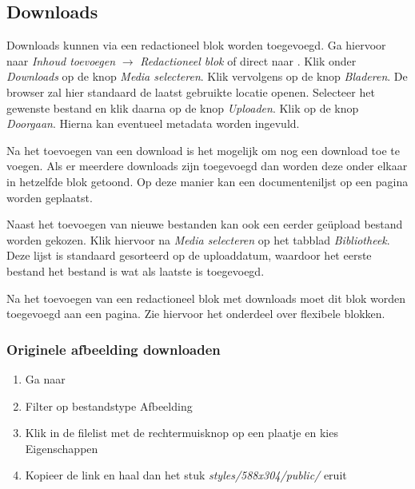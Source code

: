 
\subsection{Downloads}
Downloads kunnen via een redactioneel blok worden toegevoegd. Ga hiervoor naar \emph{Inhoud toevoegen} $\rightarrow$ \emph{Redactioneel blok} of direct naar . Klik onder \emph{Downloads} op de knop \emph{Media selecteren}. Klik vervolgens op de knop \emph{Bladeren}. De browser zal hier standaard de laatst gebruikte locatie openen. Selecteer het gewenste bestand en klik daarna op de knop \emph{Uploaden}. Klik op de knop \emph{Doorgaan}. Hierna kan eventueel metadata worden ingevuld.

Na het toevoegen van een download is het mogelijk om nog een download toe te voegen. Als er meerdere downloads zijn toegevoegd dan worden deze onder elkaar in hetzelfde blok getoond. Op deze manier kan een documenteniljst op een pagina worden geplaatst.

Naast het toevoegen van nieuwe bestanden kan ook een eerder ge\"{u}pload bestand worden gekozen. Klik hiervoor na \emph{Media selecteren} op het tabblad \emph{Bibliotheek}. Deze lijst is standaard gesorteerd op de uploaddatum, waardoor het eerste bestand het bestand is wat als laatste is toegevoegd.

Na het toevoegen van een redactioneel blok met downloads moet dit blok worden toegevoegd aan een pagina. Zie hiervoor het onderdeel over flexibele blokken.

\subsubsection{Originele afbeelding downloaden}
\begin{enumerate}
\item Ga naar 
\item Filter op bestandstype Afbeelding
\item Klik in de filelist met de rechtermuisknop op een plaatje en kies Eigenschappen
\item Kopieer de link en haal dan het stuk \emph{styles/588x304/public/} eruit
\end{enumerate}

